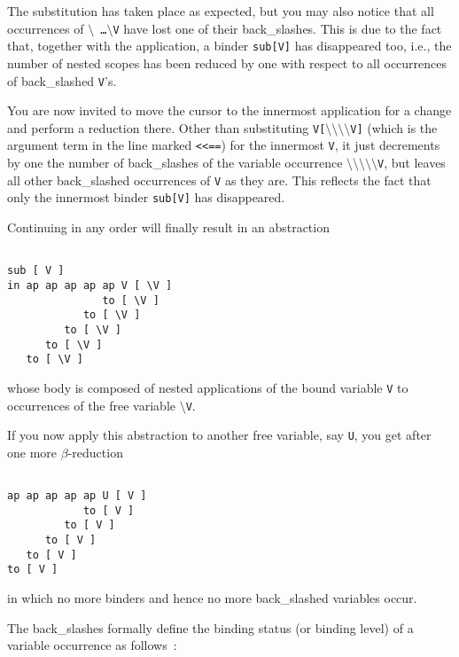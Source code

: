 The substitution has taken place as expected, but you may also notice that 
all occurrences of {\tt $\setminus$ \ldots $\setminus$V} have lost one of
their back\_slashes. This is due to the fact that,
 together with the application, a binder {\tt sub[V]} has disappeared too,
i.e., the number of nested scopes has been reduced by one with respect
to all occurrences of back\_slashed {\tt V}'s.

You are now invited  to move the cursor to the innermost application
 for a change and perform a reduction there. Other than substituting 
{\tt V[$\setminus\setminus\setminus\setminus$V]} (which is the
argument term in the line marked {\tt <<==}) for the innermost {\tt V}, it
just decrements by one the number of back\_slashes of the variable
occurrence {\tt $\setminus\setminus\setminus\setminus\setminus$V},
but leaves all other back\_slashed occurrences of {\tt V} as they are. This
reflects the fact that only the innermost binder {\tt sub[V]} has disappeared.

Continuing in any order will finally result in an abstraction
\begin{verbatim}

sub [ V ]
in ap ap ap ap ap V [ \V ]
               to [ \V ]
            to [ \V ]
         to [ \V ]
      to [ \V ]
   to [ \V ]

\end{verbatim}
whose body is composed of nested applications of the bound variable {\tt V}
to occurrences of the free variable {\tt $\setminus$V}. 

If you now apply this abstraction to another free variable, say {\tt U},
you get
after one more $\beta$-reduction
\begin{verbatim}

ap ap ap ap ap U [ V ]
            to [ V ]
         to [ V ]
      to [ V ]
   to [ V ]
to [ V ]

\end{verbatim}
in which no more binders and hence no more back\_slashed variables occur.
 
The back\_slashes formally define the {\mys binding status}
 (or {\mys binding level}) of a variable occurrence
as follows~\cite{brui72,berk82b}:

